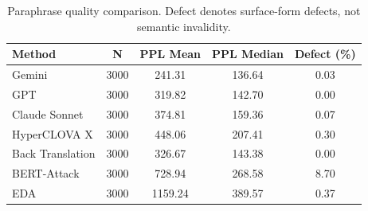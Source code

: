 \begin{table}[h]
\centering
\caption{Paraphrase quality comparison. Defect denotes surface-form defects, not semantic invalidity.}
\label{tab:quality}
\begin{tabular}{lcccc}
\hline
Method & N & PPL Mean & PPL Median & Defect (\%) \\
\hline
Gemini & 3000 & 241.31 & 136.64 & 0.03 \\
GPT & 3000 & 319.82 & 142.70 & 0.00 \\
Claude Sonnet & 3000 & 374.81 & 159.36 & 0.07 \\
HyperCLOVA X & 3000 & 448.06 & 207.41 & 0.30 \\
\hline
Back Translation & 3000 & 326.67 & 143.38 & 0.00 \\
BERT-Attack & 3000 & 728.94 & 268.58 & 8.70 \\
EDA & 3000 & 1159.24 & 389.57 & 0.37 \\
\hline
\end{tabular}
\end{table}